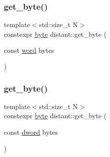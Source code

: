 \mbox{\label{namespacedistant_a0f9ebb6f0a15b607a7b15ecbeb6af958}} 
\subsubsection{\texorpdfstring{get\+\_\+byte()}{get\_byte()}\hspace{0.1cm}{\footnotesize\ttfamily [1/3]}}
{\footnotesize\ttfamily template$<$std\+::size\+\_\+t N$>$ \\
constexpr \mbox{\hyperlink{namespacedistant_af9c3f04a9b855a1368d6c1a9ce28c2f4}{byte}} distant\+::get\+\_\+byte (\begin{DoxyParamCaption}\item[{const \mbox{\hyperlink{namespacedistant_a615d26c8218c108ba83dfea768c0e130}{word}}}]{bytes }\end{DoxyParamCaption})\hspace{0.3cm}{\ttfamily [noexcept]}}

\mbox{\label{namespacedistant_aa9bd72cd14756eceba7009980b84e19a}} 
\subsubsection{\texorpdfstring{get\+\_\+byte()}{get\_byte()}\hspace{0.1cm}{\footnotesize\ttfamily [2/3]}}
{\footnotesize\ttfamily template$<$std\+::size\+\_\+t N$>$ \\
constexpr \mbox{\hyperlink{namespacedistant_af9c3f04a9b855a1368d6c1a9ce28c2f4}{byte}} distant\+::get\+\_\+byte (\begin{DoxyParamCaption}\item[{const \mbox{\hyperlink{namespacedistant_a9fa41a5a1a17dcbd24da1c1855c92489}{dword}}}]{bytes }\end{DoxyParamCaption})\hspace{0.3cm}{\ttfamily [noexcept]}}

\mbox{\label{namespacedistant_a109646e8e7f0c98fefc2ff6a07c28717}} 
